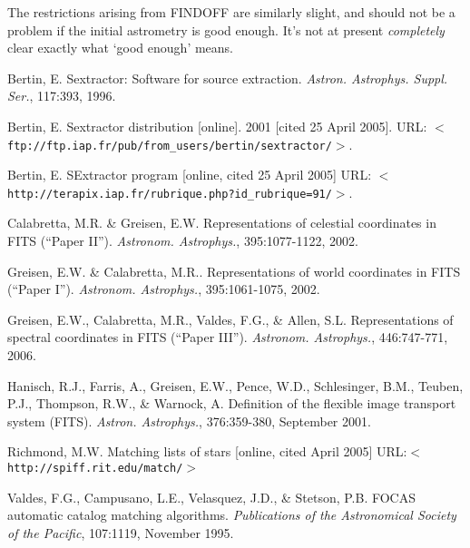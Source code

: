 \documentclass[twoside,11pt]{article}
\begin{document}
The restrictions arising from FINDOFF are similarly slight, and should not be
a problem if the initial astrometry is good enough.  It's not at present
\textit{completely} clear exactly what `good enough' means.

\begin{thebibliography}{}
  
 Bertin, E. Sextractor: Software for source
  extraction. \textit{Astron. Astrophys. Suppl. Ser.}, 117:393, 1996.

 Bertin, E. Sextractor distribution [online]. 2001
  [cited 25 April 2005]. URL:
  \texttt{$<$ftp://ftp.iap.fr/pub/from\_users/bertin/sextractor/$>$}.

 Bertin, E. SExtractor program [online, cited 25 April
  2005] URL:
  \texttt{$<$http://terapix.iap.fr/rubrique.php?id\_rubrique=91/$>$}.
  
 Calabretta, M.R. \& Greisen, E.W. Representations of
  celestial coordinates in FITS (``Paper II''). \textit{Astronom. Astrophys.},
  395:1077-1122, 2002.
  
 Greisen, E.W. \& Calabretta, M.R.. Representations of world
  coordinates in FITS (``Paper I''). \textit{Astronom. Astrophys.},
  395:1061-1075, 2002.
  
 Greisen, E.W., Calabretta, M.R., Valdes, F.G., \& Allen,
  S.L. Representations of spectral coordinates in FITS (``Paper III'').
  \textit{Astronom. Astrophys.}, 446:747-771, 2006.

 Hanisch, R.J., Farris, A., Greisen, E.W., Pence, W.D.,
  Schlesinger, B.M., Teuben, P.J., Thompson, R.W., \& Warnock, A. Definition
  of the flexible image transport system (FITS). \textit{Astron. Astrophys.},
  376:359-380, September 2001.
  
 Richmond, M.W. Matching lists of stars [online, cited
  April 2005] URL:\texttt{$<$http://spiff.rit.edu/match/$>$}
  
 Valdes, F.G., Campusano, L.E., Velasquez, J.D., \& Stetson,
  P.B. FOCAS automatic catalog matching algorithms. \textit{Publications of
    the Astronomical Society of the Pacific}, 107:1119, November 1995.

\end{thebibliography}
\end{document}
